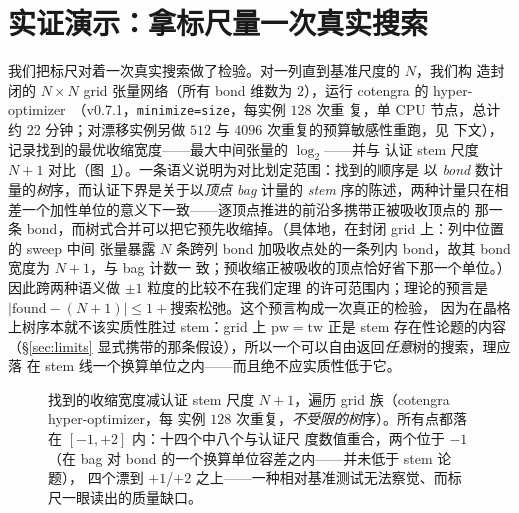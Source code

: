 \documentclass[11pt]{ctexart}
\newcommand{\pw}{\mathrm{pw}}
\newcommand{\tw}{\mathrm{tw}}
\begin{document}
\section{实证演示：拿标尺量一次真实搜索}\label{sec:empirical}

我们把标尺对着一次真实搜索做了检验。对一列直到基准尺度的 $N$，我们构
造封闭的 $N\times N$ grid 张量网络（所有 bond 维数为 $2$），运行 cotengra 的
hyper-optimizer~\cite{gray2021hyper}（v0.7.1，\texttt{minimize=size}，每实例 $128$ 次重
复，单 CPU 节点，总计约 22 分钟；对漂移实例另做 $512$ 与 $4096$ 次重复的预算敏感性重跑，见
下文），记录找到的最优收缩宽度——最大中间张量的 $\log_2$——并与
认证 stem 尺度 $N+1$ 对比（图~\ref{fig:gapplot}）。一条语义说明为对比划定范围：找到的顺序是
以 \emph{bond} 数计量的\emph{树}序，而认证下界是关于以\emph{顶点 bag} 计量的 \emph{stem}
序的陈述，两种计量只在相差一个加性单位的意义下一致——逐顶点推进的前沿多携带正被吸收顶点的
那一条 bond，而树式合并可以把它预先收缩掉。（具体地，在封闭 grid 上：列中位置的 sweep 中间
张量暴露 $N$ 条跨列 bond 加吸收点处的一条列内 bond，故其 bond 宽度为 $N{+}1$，与 bag 计数一
致；预收缩正被吸收的顶点恰好省下那一个单位。）因此跨两种语义做 $\pm 1$ 粒度的比较不在我们定理
的许可范围内；理论的预言是 $|\text{found}-(N{+}1)|\le 1+\text{搜索松弛}$。这个预言构成一次真正的检验，
因为在晶格上树序本就不该实质性胜过 stem：grid 上 $\pw=\tw$ 正是 stem 存在性论题的内容
（\S\ref{sec:limits} 显式携带的那条假设），所以一个可以自由返回\emph{任意}树的搜索，理应落
在 stem 线一个换算单位之内——而且绝不应实质性低于它。

\begin{figure}[t]
\centering
{}
\caption{找到的收缩宽度减认证 stem 尺度 $N+1$，遍历 grid 族（cotengra hyper-optimizer，每
实例 $128$ 次重复，\emph{不受限的树}序）。所有点都落在 $[-1,+2]$ 内：十四个中八个与认证尺
度数值重合，两个位于 $-1$（在 bag 对 bond 的一个换算单位容差之内——并未低于 stem 论题），
四个漂到 $+1$/$+2$ 之上——一种相对基准测试无法察觉、而标尺一眼读出的质量缺口。}
\label{fig:gapplot}
\end{figure}
\end{document}

